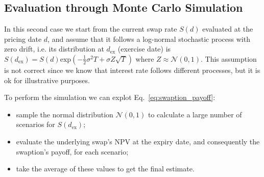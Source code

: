 \subsection{Evaluation through Monte Carlo Simulation}
\label{evaluation-through-monte-carlo-simulation}

In this second case we start from the current swap rate \(S(d)\)
evaluated at the pricing date \(d\), and assume that it follows a
log-normal stochastic process with zero drift, i.e. its distribution at
\(d_{\mathrm{ex}}\) (exercise date) is
\(S(d_{\mathrm{ex}}) = S(d)\mathrm{exp}(-\frac{1}{2}\sigma^{2}T+\sigma Z\sqrt{T})\)
where $Z\approx\mathcal{N}(0,1)$.
This assumption is not correct since we know that interest rate follows 
different processes, but it is ok for illustrative purposes. 

To perform the simulation we can explot Eq.~\ref{eq:swaption_payoff}:

\begin{itemize}
\tightlist
\item
  sample the normal distribution \(\mathcal{N}(0, 1)\) to calculate a
  large number of scenarios for \(S(d_{\mathrm{ex}})\);
\item
  evaluate the underlying swap's NPV at the expiry date, and
  consequently the swaption's payoff, for each scenario;
\item
  take the average of these values to get the final estimate.
\end{itemize}

